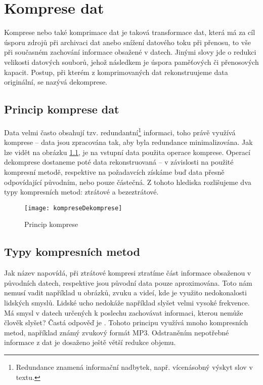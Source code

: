 \chapter{Komprese dat}
Komprese nebo také komprimace dat je taková transformace dat, která má za cíl úsporu zdrojů při archivaci dat anebo snížení datového toku při přenosu, to vše při současném zachování informace obsažené v datech. Jinými slovy jde o redukci velikosti datových souborů, jehož následkem je úspora paměťových či přenosových kapacit. Postup, při kterém z komprimovaných dat rekonstruujeme data originální, se nazývá dekomprese.

\section{Princip komprese dat}
\label{sekcePrincipKompreseDat}
Data velmi často obsahují tzv. redundantní\footnote{Redundance znamená informační nadbytek, např. vícenásobný výskyt slov v textu.} informaci, toho právě využívá komprese -- data jsou zpracována tak, aby byla redundance minimalizována. Jak lze vidět na obrázku \ref{kompreseDekomprese}, je na vstupní data použita operace komprese. Operací dekomprese dostaneme poté data rekonstruovaná -- v závislosti na použité kompresní metodě, respektive na požadavcích získáme buď data přesně odpovídající původním, nebo pouze částečná. Z tohoto hlediska rozlišujeme dva typy kompresních metod: ztrátové a bezeztrátové.

\begin{figure}[!htb]
\centering
\texttt{[image: kompreseDekomprese]}
\caption{Princip komprese}
\label{kompreseDekomprese}
\end{figure}

\section{Typy kompresních metod}
Jak název napovídá, při ztrátové kompresi ztratíme část informace obsaženou v původních datech, respektive jsou původní data pouze aproximována.  Toto nám nemusí vadit například u obrázků, zvuku a videí, kde je využito nedokonalosti lidských smyslů. Lidské ucho nedokáže například slyšet velmi vysoké frekvence. Má smysl v datech určených k poslechu zachovávat informaci, kterou nemůže člověk slyšet? Častá odpověď je . Tohoto principu využívá mnoho kompresních metod, například známý zvukový formát MP3. Odstraněním nepotřebné informace z dat je dosaženo ještě větší redukce objemu. 

